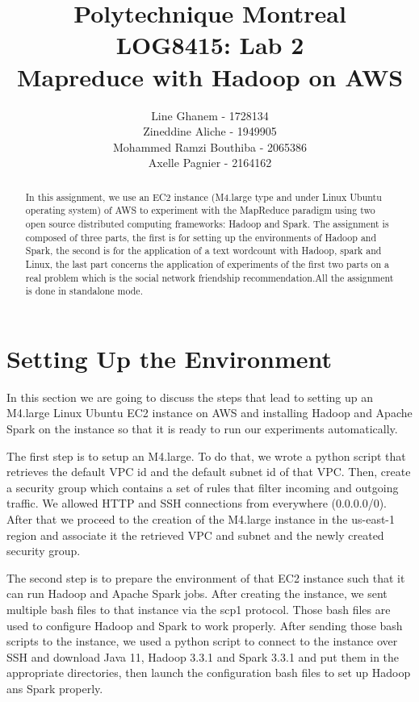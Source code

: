 \documentclass[12pt]{article}
\title{Polytechnique Montreal \\
LOG8415: Lab 2\\
Mapreduce with Hadoop on AWS}
\author{Line Ghanem - 1728134\\Zineddine Aliche - 1949905\\
Mohammed Ramzi Bouthiba - 2065386\\Axelle Pagnier - 2164162}
\begin{document}
\maketitle

\begin{abstract}
In this assignment, we use an EC2 instance (M4.large type and under Linux Ubuntu operating system) of AWS to experiment with the MapReduce paradigm using two open source distributed computing frameworks: Hadoop and Spark. The assignment is composed of three parts, the first is for setting up the environments of Hadoop and Spark, the second is for the application of a text wordcount with Hadoop, spark and Linux, the last part concerns the application of experiments of the first two parts on a real problem which is the social network friendship recommendation.All the assignment is done in standalone mode.
\end{abstract}

\section{Setting Up the Environment}

In this section we are going to discuss the steps that lead to setting up an M4.large Linux Ubuntu EC2 instance on AWS and installing Hadoop and Apache Spark on the instance so that it is ready to run our experiments automatically.\newline

\noindent The first step is to setup an M4.large. To do that, we wrote a python script that retrieves the default VPC id and the default subnet id of that VPC. Then, create a security group  which contains a set of rules that filter incoming and outgoing traffic. We allowed HTTP and SSH connections from everywhere (0.0.0.0/0). After that we proceed to the creation of the M4.large instance in the us-east-1 region and associate it the retrieved VPC and subnet and the newly created security group. \newline

\noindent The second step is to prepare the environment of that EC2 instance such that it can run Hadoop and Apache Spark jobs. After creating the instance, we sent multiple bash files to that instance via the scp1 protocol. Those bash files are used to configure Hadoop and Spark to work properly. After sending those bash scripts to the instance, we used a python script to connect to the instance over SSH and download Java 11, Hadoop 3.3.1 and Spark 3.3.1 and put them in the appropriate directories, then launch the configuration bash files to set up Hadoop ans Spark properly.\newline
\end{document}
